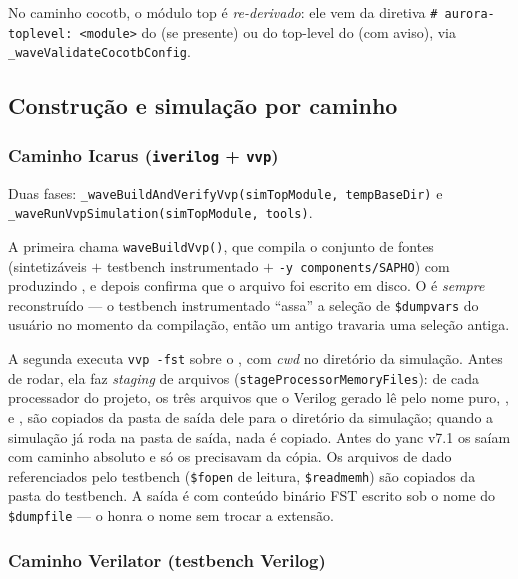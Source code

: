 No caminho cocotb, o módulo top é \emph{re-derivado}: ele vem da diretiva
\lstinline|# aurora-toplevel: <module>| do  (se presente) ou do
top-level do  (com aviso), via
\lstinline|_waveValidateCocotbConfig|.

\subsection{Construção e simulação por caminho}

\subsubsection{Caminho Icarus (\texttt{iverilog} + \texttt{vvp})}

Duas fases: \lstinline|_waveBuildAndVerifyVvp(simTopModule, tempBaseDir)| e
\lstinline|_waveRunVvpSimulation(simTopModule, tools)|.

A primeira chama \lstinline|waveBuildVvp()|, que compila o conjunto de fontes
(sintetizáveis $+$ testbench instrumentado $+$ \lstinline|-y components/SAPHO|)
com  produzindo , e depois confirma que o
arquivo foi escrito em disco. O  é \emph{sempre} reconstruído ---
o testbench instrumentado \enquote{assa} a seleção de \lstinline|$dumpvars| do
usuário no momento da compilação, então um  antigo travaria uma
seleção antiga.

A segunda executa \lstinline|vvp -fst| sobre o , com \emph{cwd} no
diretório da simulação. Antes de rodar, ela faz \emph{staging} de arquivos
(\lstinline|stageProcessorMemoryFiles|): de cada processador do projeto, os três
arquivos que o Verilog gerado lê pelo nome puro, ,
 e , são copiados da pasta de
saída dele para o diretório da simulação; quando a simulação já roda na pasta de
saída, nada é copiado. Antes do yanc v7.1 os  saíam com caminho
absoluto e só os  precisavam da cópia. Os arquivos de dado
referenciados pelo testbench (\lstinline|$fopen| de leitura,
\lstinline|$readmemh|) são copiados da pasta do testbench. A saída é  com conteúdo binário FST escrito
sob o nome do \lstinline|$dumpfile| --- o  honra o nome sem trocar a
extensão.

\subsubsection{Caminho Verilator (testbench Verilog)}

